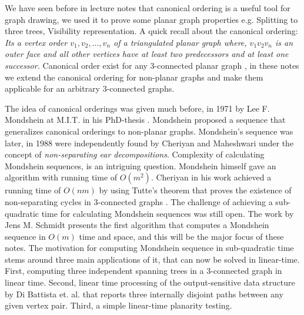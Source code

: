 We have seen before in lecture notes that canonical ordering is a useful tool for graph drawing, we used it to prove some planar graph properties e.g. Splitting to three trees, Visibility representation.
A quick recall about the canonical ordering: 
\textit{Its a vertex order $v_1,v_2,...,v_n$ of a triangulated planar graph where, $v_1v_2v_n$ is an outer face and all other vertices have at least two predecessors and at least one successor.}
Canonical order exist for any 3-connected planar graph \cite{kant}, in these notes we extend the canonical ordering for non-planar graphs and make them applicable for an arbitrary 3-connected graphs.

The idea of canonical orderings was given much before, in 1971 by Lee F. Mondshein at M.I.T. in his PhD-thesis \cite{mond}.
Mondshein proposed a sequence that generalizes canonical orderings to non-planar graphs.
Mondshein's sequence was later, in 1988 were independently found by Cheriyan and Maheshwari \cite{cheriyan} under the concept of \textit{non-separating ear decompositions}.
Complexity of calculating Mondshein sequences, is an intriguing question.
Mondshein himself gave an algorithm with running time of $O(m^2)$.
Cheriyan in his work achieved a running time of $O(nm)$ by using Tutte's theorem that proves the existence of non-separating cycles in 3-connected graphs \cite{tutte1963draw}.
The challenge of achieving a sub-quadratic time for calculating Mondshein sequences was still open.
The work by Jens M. Schmidt \cite{Schmidt13a} presents the first algorithm that computes a Mondshein sequence in $O(m)$ time and space, and this will be the major focus of these notes.
The motivation for computing Mondshein sequence in sub-quadratic time stems around three main applications of it, that can now be solved in linear-time.
First, computing three independent spanning trees in a 3-connected graph in linear time.
Second, linear time processing of the output-sensitive data structure by Di Battista et. al. \cite{Battista} that reports three internally disjoint paths between any given vertex pair.
Third, a simple linear-time planarity testing.
